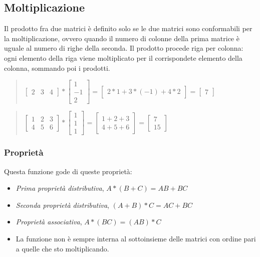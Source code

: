 \documentclass[a4paper]{article}
\begin{document}
\subsection{Moltiplicazione}
Il prodotto fra due matrici è definito solo se le due matrici sono conformabili per la moltiplicazione, ovvero quando il numero di colonne della prima matrice è uguale al numero di righe della seconda. Il prodotto procede riga per colonna: ogni elemento della riga viene moltiplicato per il corrispondete elemento della colonna, sommando poi i prodotti.
\\
\begin{quote} \centering $\left[\begin{matrix} 2 & 3 & 4\end{matrix}\right] * \left[\begin{matrix}1 \\ -1 \\ 2 \end{matrix}\right] = \left[\begin{matrix}2*1 + 3*(-1) + 4*2 \end{matrix}\right]= \left[\begin{matrix}7\end{matrix}\right]
$\end{quote}
\begin{quote} \centering $\left[\begin{matrix} 1 & 2 & 3 \\ 4 & 5 & 6\end{matrix}\right] * \left[\begin{matrix}1 \\ 1 \\ 1 \end{matrix}\right] = \left[\begin{matrix} 1 + 2 + 3\\ 4 + 5 + 6 \end{matrix}\right]= \left[\begin{matrix}7 \\ 15 \end{matrix}\right]
$\end{quote}
\subsubsection{Proprietà}
Questa funzione gode di queste proprietà:
\begin{itemize}
\item \textit{Prima proprietà distributiva}, $A*(B + C) = AB + BC$
\item \textit{Seconda proprietà distributiva}, $(A + B)*C = AC +BC$
\item \textit{Proprietà associativa}, $A*(BC) = (AB)*C$
\item La funzione non è sempre interna al sottoinsieme delle matrici con ordine pari a quelle che sto moltiplicando.
\end{itemize}
\end{document}
